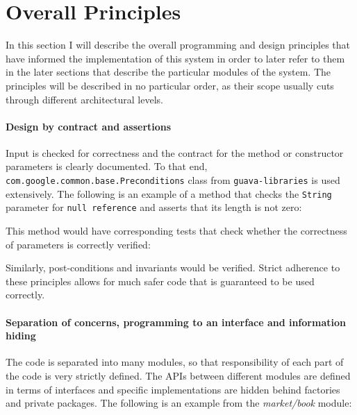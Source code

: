 \section{Overall Principles}
In this section I will describe the overall programming and design principles that have informed the implementation of this system in order to later refer to them in the later sections that describe the particular modules of the system. The principles will be described in no particular order, as their scope usually cuts through different architectural levels.

\paragraph{Design by contract and assertions} 
Input is checked for correctness and the contract for the method or constructor parameters is clearly documented. To that end, \texttt{com.google.common.base.Preconditions} class from \texttt{guava-libraries}\cite{guava} is used extensively. The following is an example of a method that checks the \texttt{String} parameter for \texttt{null reference} and asserts that its length is not zero:


This method would have corresponding tests that check whether the correctness of parameters is correctly verified:


Similarly, post-conditions and invariants would be verified. Strict adherence to these principles allows for much safer code that is guaranteed to be used correctly.

\paragraph{Separation of concerns, programming to an interface and information hiding}
The code is separated into many modules, so that responsibility of each part of the code is very strictly defined. The APIs between different modules are defined in terms of interfaces and specific implementations are hidden behind factories and private packages. The following is an example from the \textit{market/book} module:



